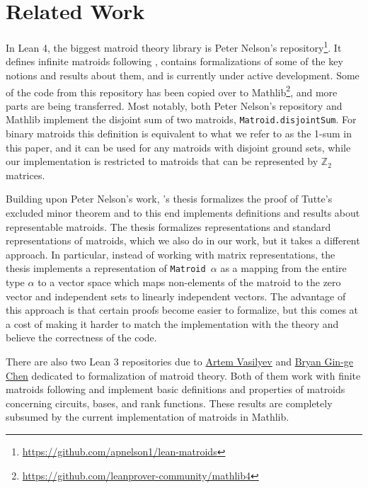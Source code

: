 \section{Related Work}

In Lean 4, the biggest matroid theory library is Peter Nelson's repository\footnote{\url{https://github.com/apnelson1/lean-matroids}}. It defines infinite matroids following \cite{Bruhn2013}, contains formalizations of some of the key notions and results about them, and is currently under active development. Some of the code from this repository has been copied over to Mathlib\footnote{\url{https://github.com/leanprover-community/mathlib4}}, and more parts are being transferred. Most notably, both Peter Nelson's repository and Mathlib implement the disjoint sum of two matroids, \texttt{Matroid.disjointSum}. For binary matroids this definition is equivalent to what we refer to as the 1-sum in this paper, and it can be used for any matroids with disjoint ground sets, while our implementation is restricted to matroids that can be represented by $\mathbb{Z}_{2}$ matrices.

Building upon Peter Nelson's work, \citeauthor{Gusakov2024}'s thesis \cite{Gusakov2024} formalizes the proof of Tutte's excluded minor theorem and to this end implements definitions and results about representable matroids. The thesis formalizes representations and standard representations of matroids, which we also do in our work, but it takes a different approach. In particular, instead of working with matrix representations, the thesis implements a representation of \texttt{Matroid $\alpha$} as a mapping from the entire type $\alpha$ to a vector space which maps non-elements of the matroid to the zero vector and independent sets to linearly independent vectors. The advantage of this approach is that certain proofs become easier to formalize, but this comes at a cost of making it harder to match the implementation with the theory and believe the correctness of the code.

There are also two Lean 3 repositories due to \href{https://github.com/VArtem/lean-matroids}{Artem Vasilyev} and \href{https://github.com/bryangingechen/lean-matroids}{Bryan Gin-ge Chen} dedicated to formalization of matroid theory. Both of them work with finite matroids following \cite{Oxley2011} and implement basic definitions and properties of matroids concerning circuits, bases, and rank functions. These results are completely subsumed by the current implementation of matroids in Mathlib.

